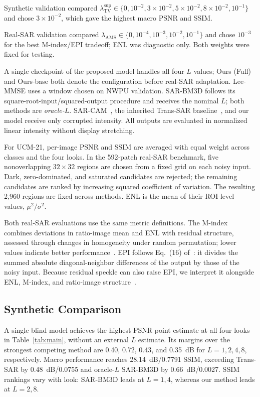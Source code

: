 \documentclass[conference]{IEEEtran}
\begin{document}
Synthetic validation compared \(\lambda_{\mathrm{TV}}^{\mathrm{sup}}\in\{0,\allowbreak 10^{-2},\allowbreak 3\times10^{-2},\allowbreak 5\times10^{-2},\allowbreak 8\times10^{-2},\allowbreak 10^{-1}\}\) and chose \(3\times10^{-2}\), which gave the highest macro PSNR and SSIM.

\begingroup
{}
\noindent Real-SAR validation compared \(\lambda_{\mathrm{AMS}}\in\{0,\allowbreak 10^{-4},\allowbreak 10^{-3},\allowbreak 10^{-2},\allowbreak 10^{-1}\}\) and chose \(10^{-3}\) for the best M-index/EPI tradeoff; ENL was diagnostic only. Both weights were fixed for testing.
\par
\endgroup

A single checkpoint of the proposed model handles all four \(L\) values; Ours (Full) and Ours-base both denote the configuration before real-SAR adaptation. Lee-MMSE uses a window chosen on NWPU validation. SAR-BM3D follows its square-root-input/squared-output procedure and receives the nominal \(L\); both methods are \emph{oracle-\(L\)}. SAR-CAM~\cite{ko2022}, the inherited Trans-SAR baseline~\cite{perera2022}, and our model receive only corrupted intensity. All outputs are evaluated in normalized linear intensity without display stretching.

For UCM-21, per-image PSNR and SSIM are averaged with equal weight across classes and the four looks. In the 592-patch real-SAR benchmark, five nonoverlapping \(32\times32\) regions are chosen from a fixed grid on each noisy input. Dark, zero-dominated, and saturated candidates are rejected; the remaining candidates are ranked by increasing squared coefficient of variation. The resulting 2,960 regions are fixed across methods. ENL is the mean of their ROI-level values, \(\mu^2/\sigma^2\).

Both real-SAR evaluations use the same metric definitions. The M-index combines deviations in ratio-image mean and ENL with residual structure, assessed through changes in homogeneity under random permutation; lower values indicate better performance~\cite{gomez2017}. EPI follows Eq.~(16) of~\cite{ma2024epi}: it divides the summed absolute diagonal-neighbor differences of the output by those of the noisy input. Because residual speckle can also raise EPI, we interpret it alongside ENL, M-index, and ratio-image structure~\cite{vasquez2025ratio}.

\subsection{Synthetic Comparison}
A single blind model achieves the highest PSNR point estimate at all four looks in Table~\ref{tab:main}, without an external \(L\) estimate. Its margins over the strongest competing method are 0.40, 0.72, 0.43, and 0.35~dB for \(L=1,2,4,8\), respectively. Macro performance reaches 28.14~dB/0.7791 SSIM, exceeding Trans-SAR by 0.48~dB/0.0755 and oracle-\(L\) SAR-BM3D by 0.66~dB/0.0027. SSIM rankings vary with look: SAR-BM3D leads at \(L=1,4\), whereas our method leads at \(L=2,8\).
\end{document}
